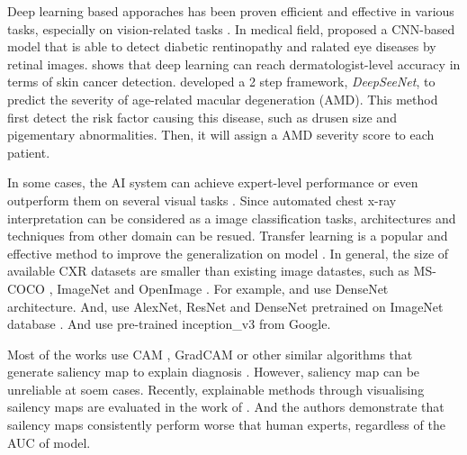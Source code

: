 Deep learning based apporaches has been proven efficient and effective in various tasks, especially on vision-related tasks \citep{Singh2020ExplainableMedicalImage}. In medical field, \citep{Ting2017DLOnEyeDisease} proposed a CNN-based model that is able to detect diabetic rentinopathy and ralated eye diseases by retinal images. \citet{Esteva2017DNNSkinCancer} shows that deep learning can reach dermatologist-level accuracy in terms of skin cancer detection. \citet{Peng2019DeepSeeNet} developed a 2 step framework, \textit{DeepSeeNet}, to predict the severity of age-related macular degeneration (AMD). This method first detect the risk factor causing this disease, such as drusen size and pigementary abnormalities. Then, it will assign a AMD severity score to each patient.

In some cases, the AI system can achieve expert-level performance or even outperform them on several visual tasks \citep{Rajpurkar2017CheXNet, Yuan2020DAM, Tang2020AbnormalityCXRCNN}.  Since automated chest x-ray interpretation can be considered as a image classification tasks, architectures and techniques from other domain can be resued. Transfer learning is a popular and effective method to improve the generalization on model \citep{Zhuang2019TransferLearningSurvey}. In general, the size of available CXR datasets are smaller than existing image datastes, such as MS-COCO \citep{Lin2014MSCOCO}, ImageNet \citep{Deng2009ImageNet} and OpenImage \citep{Kuznetsova2020OpenImages}. For example, \citet{Yuan2020DAM} and \citet{Cohen2020Covid19} use DenseNet\citep{Huang2016DenseNet} architecture. And, \citet{Dunnmon2019CNNOnCXRAssessment} use AlexNet\citep{Alex2012AlexNet}, ResNet \citep{He2015ResNet} and DenseNet pretrained on ImageNet database \citep{Deng2009ImageNet}. And \citet{Yates2018RedDotCXR} use pre-trained inception_v3\citep{Szegedy2015InceptionV3} from Google.






Most of the works use CAM \citep{Zhou2015CAM}, GradCAM\citep{Selvaraju2017GradCAM} or other similar algorithms that generate saliency map to explain diagnosis \citep{Teixeira2021LIMEAndGradCAMOnCXR, Rajpurkar2018CheXNeXt, Rajpurkar2017CheXNet, Brunese2020ExplainableCovid19, Hou2021ExplainableCovid19}. However, saliency map can be unreliable at soem cases. Recently, explainable methods through visualising sailency maps are evaluated in the work of \citep{Saporta2021BechmarkingSaliencyMethods}. And the authors demonstrate that sailency maps consistently perform worse that human experts, regardless of the AUC of model.

